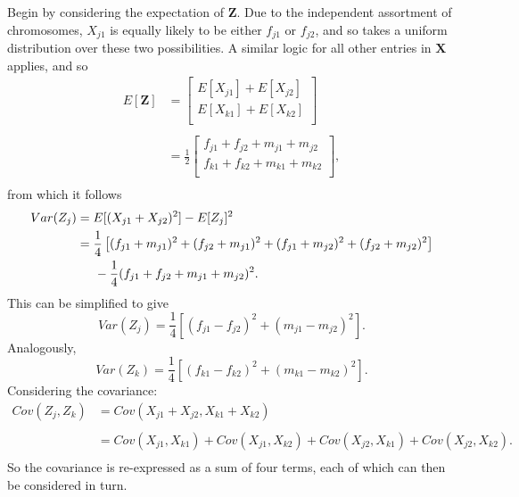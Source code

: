 \documentclass{article}
\newcommand{\ve}[1]{\mathbf{#1}}           %
\newcommand{\m}[1]{\mathbf{#1}}               %
\begin{document}
Begin by considering the expectation of $\ve{Z}$. Due to the independent assortment of chromosomes, $X_{j1}$ is equally likely to be either $f_{j1}$ or $f_{j2}$, and so takes a uniform distribution over these two possibilities. A similar logic for all other entries in $\m{X}$ applies, and so
\begin{equation*}
  \begin{split}
    E[\ve{Z}] & = {\begin{bmatrix}
        E[X_{j1}] + E[X_{j2}] \\
        E[X_{k1}] + E[X_{k2}] \\
      \end{bmatrix}} \\
    & \\
    & = {\frac{1}{2}\begin{bmatrix}
        f_{j1} + f_{j2} + m_{j1} + m_{j2} \\
        f_{k1} + f_{k2} + m_{k1} + m_{k2} \\
      \end{bmatrix}}, \\
  \end{split}
\end{equation*}
from which it follows
\begin{equation*}
  \begin{split}
    Var(Z_j) & = E[(X_{j1} + X_{j2})^2] - E[Z_j]^2 \\
    & = \frac{1}{4}\left [ (f_{j1} + m_{j1})^2 + (f_{j2} + m_{j1})^2 + (f_{j1} + m_{j2})^2 + (f_{j2} + m_{j2})^2 \right ] \\
    & \hspace{0.5cm} - \frac{1}{4}(f_{j1} + f_{j2} + m_{j1} + m_{j2})^2. \\
  \end{split}
\end{equation*}
This can be simplified to give
\begin{equation} \label{eq:z1var}
  Var(Z_j) = \frac{1}{4} \left [ (f_{j1} - f_{j2})^2 + (m_{j1} - m_{j2})^2 \right ].
\end{equation}
Analogously,
\begin{equation} \label{eq:z2var}
  Var(Z_k) = \frac{1}{4} \left [ (f_{k1} - f_{k2})^2 + (m_{k1} - m_{k2})^2 \right ].
\end{equation}
Considering the covariance:
\begin{equation} \label{eq:covstep1}
  \begin{split}
    Cov(Z_j, Z_k) & = Cov(X_{j1} + X_{j2}, X_{k1} + X_{k2}) \\
    & \\
    & =  Cov(X_{j1}, X_{k1}) + Cov(X_{j1}, X_{k2}) + Cov(X_{j2}, X_{k1}) + Cov(X_{j2}, X_{k2}). \\
  \end{split}
\end{equation}
So the covariance is re-expressed as a sum of four terms, each of which can then be considered in turn.
\end{document}
